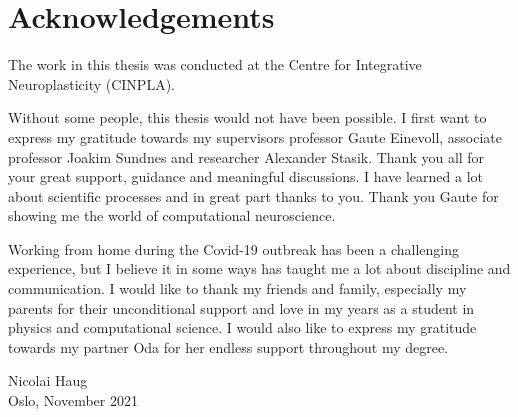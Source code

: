 \chapter*{Acknowledgements}
The work in this thesis was conducted at the Centre for Integrative Neuroplasticity (CINPLA).

Without some people, this thesis would not have been possible. I first want to express my gratitude towards my supervisors professor Gaute Einevoll, associate professor Joakim Sundnes and researcher Alexander Stasik. Thank you all for your great support, guidance and meaningful discussions. I have learned a lot about scientific processes and in great part thanks to you. Thank you Gaute for showing me the world of computational neuroscience.

Working from home during the Covid-19 outbreak has been a challenging experience, but I believe it in some ways has taught me a lot about discipline and communication. I would like to thank my friends and family, especially my parents for their unconditional support and love in my years as a student in physics and computational science. I would also like to express my gratitude towards my partner Oda for her endless support throughout my degree. 
\newline
\newline

\begin{flushright}
Nicolai Haug\\
Oslo, November 2021
\end{flushright}
